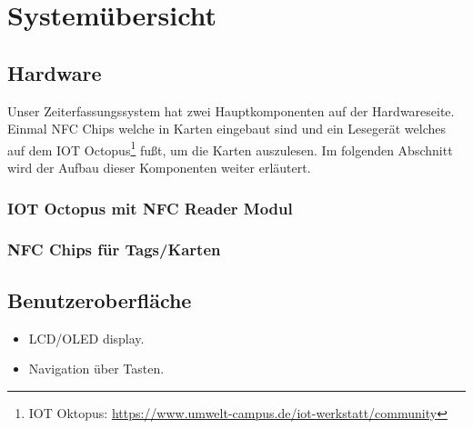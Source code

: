 \documentclass[../main.tex]{subfiles}
\begin{document}
\section{Systemübersicht}

\subsection{Hardware}
Unser Zeiterfassungssystem hat zwei Hauptkomponenten auf der Hardwareseite. Einmal NFC Chips welche in Karten eingebaut sind und ein Lesegerät welches auf dem IOT Octopus\footnote{\label{IOT Octopus}IOT Oktopus: \url{https://www.umwelt-campus.de/iot-werkstatt/community}} fußt, um die Karten auszulesen. Im folgenden Abschnitt wird der Aufbau dieser Komponenten weiter erläutert.
\subsubsection{IOT Octopus mit NFC Reader Modul}
\subsubsection{NFC Chips für Tags/Karten}

\subsection{Benutzeroberfläche}
\begin{itemize}
  \item LCD/OLED display.
  \item Navigation über Tasten.
\end{itemize}
\end{document}
